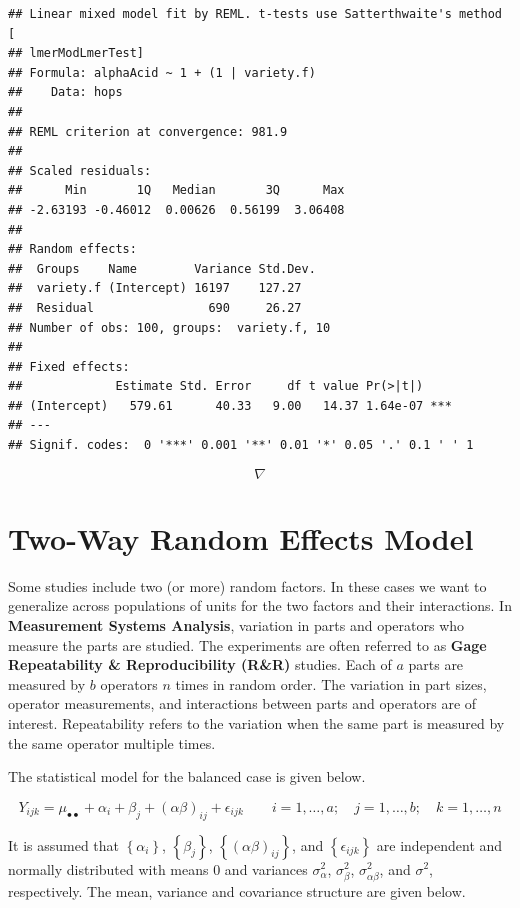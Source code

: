 \documentclass[
]{book}
\begin{document}
\begin{verbatim}
## Linear mixed model fit by REML. t-tests use Satterthwaite's method [
## lmerModLmerTest]
## Formula: alphaAcid ~ 1 + (1 | variety.f)
##    Data: hops
## 
## REML criterion at convergence: 981.9
## 
## Scaled residuals: 
##      Min       1Q   Median       3Q      Max 
## -2.63193 -0.46012  0.00626  0.56199  3.06408 
## 
## Random effects:
##  Groups    Name        Variance Std.Dev.
##  variety.f (Intercept) 16197    127.27  
##  Residual                690     26.27  
## Number of obs: 100, groups:  variety.f, 10
## 
## Fixed effects:
##             Estimate Std. Error     df t value Pr(>|t|)    
## (Intercept)   579.61      40.33   9.00   14.37 1.64e-07 ***
## ---
## Signif. codes:  0 '***' 0.001 '**' 0.01 '*' 0.05 '.' 0.1 ' ' 1
\end{verbatim}

\[ \nabla \]

\section{Two-Way Random Effects
Model}\label{two-way-random-effects-model}

Some studies include two (or more) random factors. In these cases we
want to generalize across populations of units for the two factors and
their interactions. In \textbf{Measurement Systems Analysis}, variation
in parts and operators who measure the parts are studied. The
experiments are often referred to as \textbf{Gage Repeatability \&
Reproducibility (R\&R)} studies. Each of \(a\) parts are measured by
\(b\) operators \(n\) times in random order. The variation in part
sizes, operator measurements, and interactions between parts and
operators are of interest. Repeatability refers to the variation when
the same part is measured by the same operator multiple times.

The statistical model for the balanced case is given below.

\[
Y_{ijk} = \mu_{\bullet\bullet} + \alpha_i + \beta_j + (\alpha\beta)_{ij} + \epsilon_{ijk} \qquad i=1,\ldots,a; \quad j=1,\ldots,b; \quad k=1,\ldots,n
\]

It is assumed that \(\left\{\alpha_i\right\}\),
\(\left\{\beta_j\right\}\), \(\left\{(\alpha\beta)_{ij}\right\}\), and
\(\left\{\epsilon_{ijk}\right\}\) are independent and normally
distributed with means 0 and variances \(\sigma_{\alpha}^2\),
\(\sigma_{\beta}^2\), \(\sigma_{\alpha\beta}^2\), and \(\sigma^2\),
respectively. The mean, variance and covariance structure are given
below.
\end{document}
